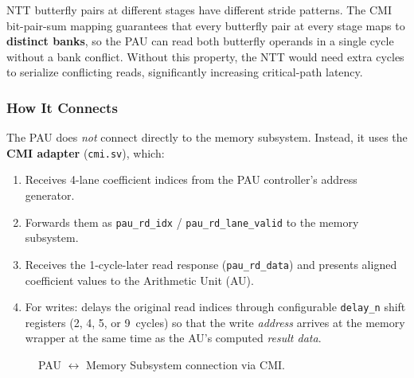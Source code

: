 \documentclass[11pt,letterpaper]{article}
\begin{document}
NTT butterfly pairs at different stages have different stride patterns.
The CMI bit-pair-sum mapping guarantees that every butterfly pair at
every stage maps to \textbf{distinct banks}, so the PAU can read both
butterfly operands in a single cycle without a bank conflict. Without
this property, the NTT would need extra cycles to serialize conflicting
reads, significantly increasing critical-path latency.

\subsubsection{How It Connects}

The PAU does \emph{not} connect directly to the memory subsystem.
Instead, it uses the \textbf{CMI adapter} (\texttt{cmi.sv}), which:

\begin{enumerate}
  \item Receives 4-lane coefficient indices from the PAU controller's
    address generator.
  \item Forwards them as \texttt{pau\_rd\_idx} /
    \texttt{pau\_rd\_lane\_valid} to the memory subsystem.
  \item Receives the 1-cycle-later read response
    (\texttt{pau\_rd\_data}) and presents aligned coefficient values to
    the Arithmetic Unit (AU).
  \item For writes: delays the original read indices through
    configurable \texttt{delay\_n} shift registers (2, 4, 5, or
    9~cycles) so that the write \emph{address} arrives at the memory
    wrapper at the same time as the AU's computed \emph{result data}.
\end{enumerate}

\begin{figure}[H]
\centering
{}
\caption{PAU $\leftrightarrow$ Memory Subsystem connection via CMI.}
\label{fig:pau_conn}
\end{figure}
\end{document}
